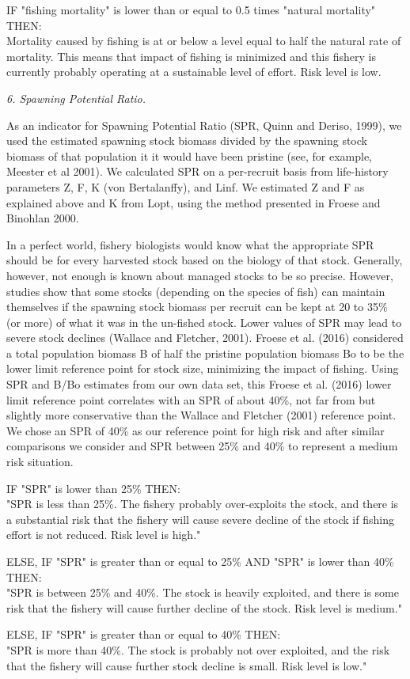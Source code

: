 IF "fishing mortality" is lower than or equal to 0.5 times "natural mortality" THEN:\\[0cm]
Mortality caused by fishing is at or below a level equal to half the natural rate of mortality. This means that impact of fishing is minimized and this fishery is currently probably operating at a sustainable level of effort. Risk level is low.

\clearpage
\newpage

\textit{6. Spawning Potential Ratio.}

As an indicator for Spawning Potential Ratio (SPR, Quinn and Deriso, 1999), we used the estimated spawning stock biomass divided by the spawning stock biomass of that population it it would have been pristine (see, for example, Meester et al 2001). We calculated SPR on a per-recruit basis from life-history parameters Z, F, K (von Bertalanffy), and Linf. We estimated Z and F as explained above and K from Lopt, using the method presented in Froese and Binohlan 2000.

In a perfect world, fishery biologists would know what the appropriate SPR should be for every harvested stock based on the biology of that stock. Generally, however, not enough is known about managed stocks to be so precise. However, studies show that some stocks (depending on the species of fish) can maintain themselves if the spawning stock biomass per recruit can be kept at 20 to 35\% (or more) of what it was in the un-fished stock. Lower values of SPR may lead to severe stock declines (Wallace and Fletcher, 2001). Froese et al. (2016) considered a total population biomass B of half the pristine population biomass Bo to be the lower limit reference point for stock size, minimizing the impact of fishing. Using SPR and B/Bo estimates from our own data set, this Froese et al. (2016) lower limit reference point correlates with an SPR of about 40\%, not far from but slightly more conservative than the Wallace and Fletcher (2001) reference point. We chose an SPR of 40\% as our reference point for high risk and after similar comparisons we consider and SPR between 25\% and 40\% to represent a medium risk situation.

IF "SPR" is lower than 25\% THEN:\\[0cm]
"SPR is less than 25\%. The fishery probably over-exploits the stock, and there is a substantial risk that the fishery will cause severe decline of the stock if fishing effort is not reduced. Risk level is high."

ELSE, IF "SPR" is greater than or equal to 25\% AND "SPR" is lower than 40\% THEN:\\[0cm]
"SPR is between 25\% and 40\%. The stock is heavily exploited, and there is some risk that the fishery will cause further decline of the stock. Risk level is medium."

ELSE, IF "SPR" is greater than or equal to 40\% THEN:\\[0cm]
"SPR is more than 40\%. The stock is probably not over exploited, and the risk that the fishery will cause further stock decline is small. Risk level is low."